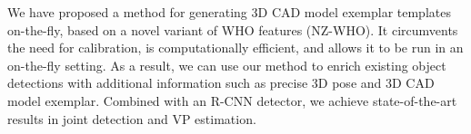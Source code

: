 We have proposed a method for generating 3D CAD model
exemplar templates on-the-fly, based on a novel variant of
WHO features (NZ-WHO). It circumvents the need for
calibration, is computationally efficient, and allows it to be run in
an on-the-fly setting. As a result, we can use our method to enrich
existing object detections with additional information such as
precise 3D pose and 3D CAD model exemplar. Combined with an R-CNN
detector, we achieve state-of-the-art
results in joint detection and VP estimation.
